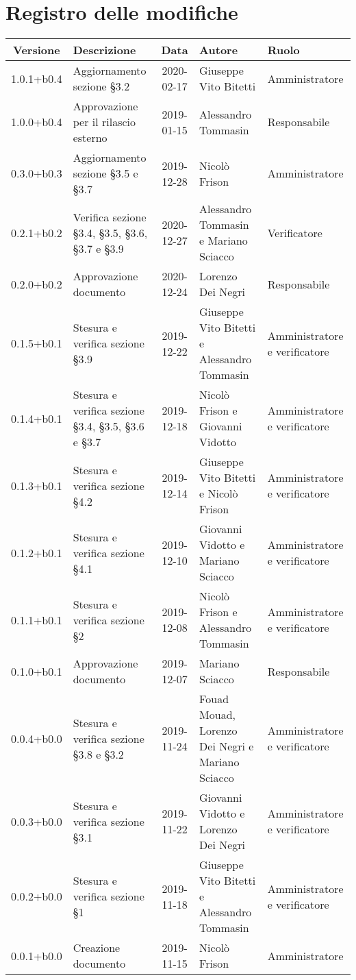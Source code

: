 \section*{Registro delle modifiche}

\begin{center}
	\begin{longtable}{|c|p{3cm}|c|p{4cm}|p{3cm}|}
	\hline
	\rowcolor{lighter-grayer}
	\textbf{Versione} & \textbf{Descrizione} & \textbf{Data} & \textbf{Autore} & \textbf{Ruolo} \\
	\hline
	\endfirsthead



	1.0.1+b0.4 & Aggiornamento sezione \S3.2 & 2020-02-17 & Giuseppe Vito Bitetti & Amministratore \\
	\hline
	1.0.0+b0.4 & Approvazione per il rilascio esterno & 2019-01-15 & Alessandro Tommasin & Responsabile \\
	\hline
	0.3.0+b0.3 & Aggiornamento sezione \S3.5 e \S3.7 & 2019-12-28 & Nicolò Frison & Amministratore \\
	\hline
	0.2.1+b0.2 & Verifica sezione \S3.4, \S3.5, \S3.6, \S3.7 e \S3.9 & 2020-12-27 & Alessandro Tommasin e Mariano Sciacco & Verificatore\\
  \hline
	0.2.0+b0.2 & Approvazione documento & 2020-12-24 & Lorenzo Dei Negri & Responsabile \\
	\hline
	0.1.5+b0.1 & Stesura e verifica sezione \S3.9 & 2019-12-22 & Giuseppe Vito Bitetti e Alessandro Tommasin  & Amministratore e verificatore \\
	\hline
	0.1.4+b0.1 & Stesura e verifica sezione \S3.4, \S3.5, \S3.6 e \S3.7 & 2019-12-18 & Nicolò Frison e Giovanni Vidotto & Amministratore e verificatore \\
	\hline
	0.1.3+b0.1 & Stesura e verifica sezione \S4.2 & 2019-12-14 & Giuseppe Vito Bitetti e Nicolò Frison & Amministratore e verificatore \\
	\hline
	0.1.2+b0.1 & Stesura e verifica sezione \S4.1 & 2019-12-10 & Giovanni Vidotto e Mariano Sciacco & Amministratore e verificatore \\
	\hline
	0.1.1+b0.1 & Stesura e verifica sezione \S2  & 2019-12-08 & Nicolò Frison e Alessandro Tommasin & Amministratore e verificatore \\
	\hline
	0.1.0+b0.1 & Approvazione documento & 2019-12-07 & Mariano Sciacco & Responsabile \\
	\hline
	0.0.4+b0.0 & Stesura e verifica sezione \S3.8 e \S3.2 & 2019-11-24 & Fouad Mouad, Lorenzo Dei Negri e Mariano Sciacco & Amministratore e verificatore \\
	\hline
	0.0.3+b0.0 & Stesura e verifica sezione \S3.1 & 2019-11-22 & Giovanni Vidotto e Lorenzo Dei Negri & Amministratore e verificatore \\
	\hline
	0.0.2+b0.0 & Stesura e verifica sezione \S1 & 2019-11-18 & Giuseppe Vito Bitetti e Alessandro Tommasin & Amministratore e verificatore \\
	\hline
	0.0.1+b0.0 & Creazione documento & 2019-11-15 & Nicolò Frison & Amministratore  \\
	\hline

	\end{longtable}
\end{center}
